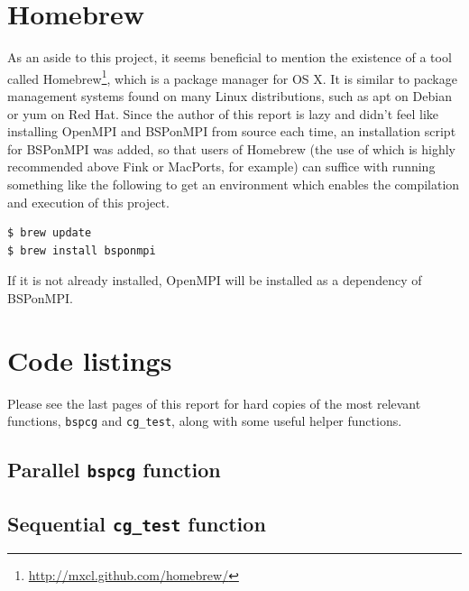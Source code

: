 \documentclass[a4paper]{article}
\begin{document}
\clearpage
\section{Homebrew}

As an aside to this project, it seems beneficial to mention the existence of a
tool called Homebrew\footnote{\url{http://mxcl.github.com/homebrew/}}, which is
a package manager for OS X. It is similar to package management systems found
on many Linux distributions, such as apt on Debian or yum on Red Hat. Since the
author of this report is lazy and didn't feel like installing OpenMPI and
BSPonMPI from source each time, an installation script for BSPonMPI was added,
so that users of Homebrew (the use of which is highly recommended above Fink or MacPorts,
for example) can suffice with running something like the following to get an
environment which enables the compilation and execution of this project.

\begin{verbatim}
$ brew update
$ brew install bsponmpi
\end{verbatim}

If it is not already installed, OpenMPI will be installed as a dependency of BSPonMPI.

\section{Code listings}

Please see the last pages of this report for hard copies of the most relevant
functions, \texttt{bspcg} and \texttt{cg\_test}, along with some useful helper functions.

\subsection{Parallel \texttt{bspcg} function}\label{sec:par-code}

\subsection{Sequential \texttt{cg\_test} function}\label{sec:seq-code}



\end{document}
